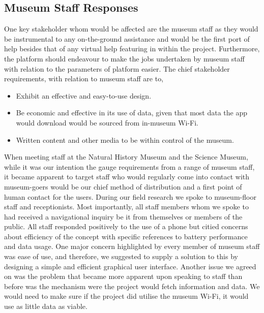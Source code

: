 \subsection{Museum Staff Responses}
One key stakeholder whom would be affected are the museum staff as they would be instrumental to any on-the-ground assistance and would be the first port of help besides that of any virtual help featuring in within the project. Furthermore, the platform should endeavour to make the jobs undertaken by museum staff with relation to the parameters of platform easier.  
The chief stakeholder requirements, with relation to museum staff are to,
\begin{itemize}
    \item Exhibit an effective and easy-to-use design. 
    \item Be economic and effective in its use of data, given that most data the app would download would be sourced from in-museum Wi-Fi. 
    \item Written content and other media to be within control of the museum.
\end{itemize}
When meeting staff at the Natural History Museum and the Science Museum, while it was our intention the gauge requirements from a range of museum staff, it became apparent to target staff who would regularly come into contact with museum-goers would be our chief method of distribution and a first point of human contact for the users. During our field research we spoke to museum-floor staff and receptionists. Most importantly, all staff members whom we spoke to had received a navigational inquiry be it from themselves or members of the public. All staff responded positively to the use of a phone but citied concerns about efficiency of the concept with specific references to battery performance and data usage. One major concern highlighted by every member of museum staff was ease of use, and therefore, we suggested to supply a solution to this by designing a simple and efficient graphical user interface. Another issue we agreed on was the problem that became more apparent upon speaking to staff than before was the mechanism were the project would fetch information and data. We would need to make sure if the project did utilise the museum Wi-Fi, it would use as little data as viable.  

